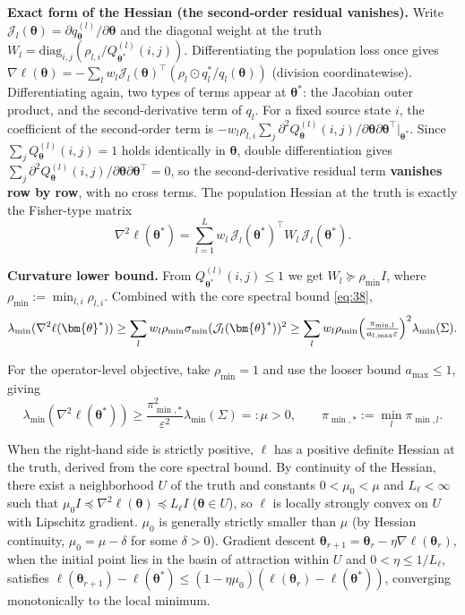 \documentclass[11pt,a4paper]{article}
\theoremstyle{remark}
\begin{document}
\textbf{Exact form of the Hessian (the second-order residual vanishes).} Write
$\mathcal{J}_l(\bm{\theta})=\partial q_{\bm{\theta}}^{(l)}/\partial\bm{\theta}$ and the
diagonal weight at the truth
$W_l=\mathrm{diag}_{i,j}(\rho_{l,i}/Q_{\bm{\theta}^*}^{(l)}(i,j))$. Differentiating the
population loss once gives
$\nabla\ell(\bm{\theta})=-\sum_lw_l\mathcal{J}_l(\bm{\theta})^{\top}(\rho_l\odot q_l^*/q_l(\bm{\theta}))$
(division coordinatewise). Differentiating again, two types of terms appear at
$\bm{\theta}^*$: the Jacobian outer product, and the second-derivative term of $q_l$. For
a fixed source state $i$, the coefficient of the second-order term is
$-w_l\rho_{l,i}\sum_j\partial^2Q_{\bm{\theta}}^{(l)}(i,j)/\partial\bm{\theta}\partial\bm{\theta}^{\top}\big|_{\bm{\theta}^*}$.
Since $\sum_jQ_{\bm{\theta}}^{(l)}(i,j)=1$ holds identically in $\bm{\theta}$, double
differentiation gives
$\sum_j\partial^2Q_{\bm{\theta}}^{(l)}(i,j)/\partial\bm{\theta}\partial\bm{\theta}^{\top}=0$,
so the second-derivative residual term \textbf{vanishes row by row}, with no cross terms.
The population Hessian at the truth is exactly the Fisher-type matrix
\[
\boxed{\nabla^2\ell(\bm{\theta}^*)=\sum_{l=1}^{L}w_l\,\mathcal{J}_l(\bm{\theta}^*)^{\top}W_l\,\mathcal{J}_l(\bm{\theta}^*)}.
\]

\textbf{Curvature lower bound.} From $Q_{\bm{\theta}^*}^{(l)}(i,j)\le1$ we get
$W_l\succeq\rho_{\min}I$, where $\rho_{\min}:=\min_{l,i}\rho_{l,i}$. Combined with the core
spectral bound \eqref{eq:38},
\[
\lambda_{\min}(\nabla^2\ell(\bm{\theta}^*))\ge\sum_lw_l\rho_{\min}\sigma_{\min}(\mathcal{J}_l(\bm{\theta}^*))^2
\ge\sum_lw_l\rho_{\min}\Bigl(\tfrac{\pi_{\min,l}}{a_{l,\max}\varepsilon}\Bigr)^2\lambda_{\min}(\Sigma).
\]

For the operator-level objective, take $\rho_{\min}=1$ and use the looser bound
$a_{\max}\le1$, giving
\[
\lambda_{\min}(\nabla^2\ell(\bm{\theta}^*))\ge\frac{\pi_{\min,*}^2}{\varepsilon^2}\lambda_{\min}(\Sigma)=:\mu>0,\qquad \pi_{\min,*}:=\min_l\pi_{\min,l}.
\]

When the right-hand side is strictly positive, $\ell$ has a positive definite Hessian at
the truth, derived from the core spectral bound. By continuity of the Hessian, there exist
a neighborhood $U$ of the truth and constants $0<\mu_0<\mu$ and $L_\ell<\infty$ such that
$\mu_0 I\preceq\nabla^2\ell(\bm{\theta})\preceq L_\ell I$ ($\bm{\theta}\in U$), so $\ell$
is locally strongly convex on $U$ with Lipschitz gradient. $\mu_0$ is generally strictly
smaller than $\mu$ (by Hessian continuity, $\mu_0=\mu-\delta$ for some $\delta>0$).
Gradient descent $\bm{\theta}_{r+1}=\bm{\theta}_r-\eta\nabla\ell(\bm{\theta}_r)$, when the
initial point lies in the basin of attraction within $U$ and $0<\eta\le1/L_\ell$, satisfies
$\ell(\bm{\theta}_{r+1})-\ell(\bm{\theta}^*)\le(1-\eta\mu_0)(\ell(\bm{\theta}_r)-\ell(\bm{\theta}^*))$,
converging monotonically to the local minimum.
\end{document}
